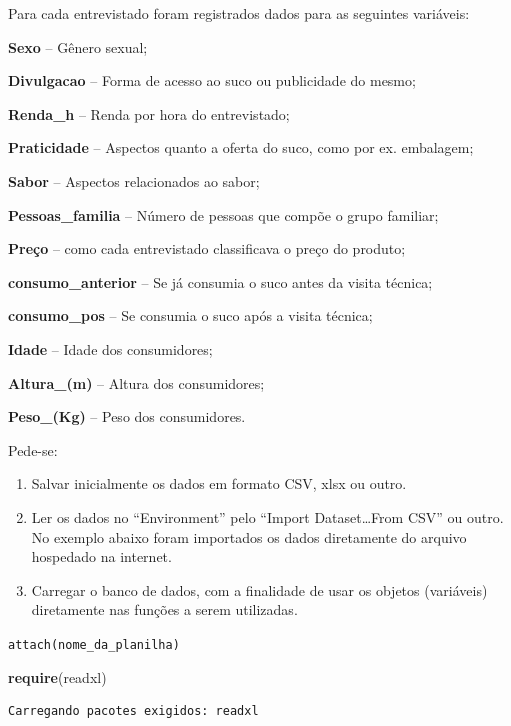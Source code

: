 \documentclass[12pt,brazil,oneside]{book}
\newenvironment{Shaded}{\begin{snugshade}}{\end{snugshade}}
\newcommand{\KeywordTok}[1]{\textcolor[rgb]{0.13,0.29,0.53}{\textbf{#1}}}
\newcommand{\NormalTok}[1]{#1}
\begin{document}
Para cada entrevistado foram registrados dados para as seguintes
variáveis:

\textbf{Sexo} -- Gênero sexual;

\textbf{Divulgacao} -- Forma de acesso ao suco ou publicidade do mesmo;

\textbf{Renda\_h} -- Renda por hora do entrevistado;

\textbf{Praticidade} -- Aspectos quanto a oferta do suco, como por ex.
embalagem;

\textbf{Sabor} -- Aspectos relacionados ao sabor;

\textbf{Pessoas\_familia} -- Número de pessoas que compõe o grupo
familiar;

\textbf{Preço} -- como cada entrevistado classificava o preço do
produto;

\textbf{consumo\_anterior} -- Se já consumia o suco antes da visita
técnica;

\textbf{consumo\_pos} -- Se consumia o suco após a visita técnica;

\textbf{Idade} -- Idade dos consumidores;

\textbf{Altura\_(m)} -- Altura dos consumidores;

\textbf{Peso\_(Kg)} -- Peso dos consumidores.

Pede-se:

\begin{enumerate}
\def\labelenumi{\arabic{enumi}.}
\item
  Salvar inicialmente os dados em formato CSV, xlsx ou outro.
\item
  Ler os dados no ``Environment'' pelo ``Import Dataset\ldots{}From
  CSV'' ou outro. No exemplo abaixo foram importados os dados
  diretamente do arquivo hospedado na internet.
\item
  Carregar o banco de dados, com a finalidade de usar os objetos
  (variáveis) diretamente nas funções a serem utilizadas.
\end{enumerate}

\texttt{attach(nome\_da\_planilha)}

\begin{Shaded}
\begin{Highlighting}[]
\KeywordTok{require}\NormalTok{(readxl)}
\end{Highlighting}
\end{Shaded}

\begin{verbatim}
Carregando pacotes exigidos: readxl
\end{verbatim}
\end{document}
